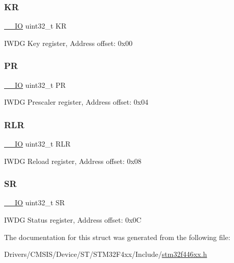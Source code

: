 \subsubsection{\texorpdfstring{KR}{KR}}
{\footnotesize\ttfamily \mbox{\hyperlink{core__sc300_8h_aec43007d9998a0a0e01faede4133d6be}{\+\_\+\+\_\+\+IO}} uint32\+\_\+t KR}

I\+W\+DG Key register, Address offset\+: 0x00 \mbox{\label{struct_i_w_d_g___type_def_af8d25514079514d38c104402f46470af}} 
\subsubsection{\texorpdfstring{PR}{PR}}
{\footnotesize\ttfamily \mbox{\hyperlink{core__sc300_8h_aec43007d9998a0a0e01faede4133d6be}{\+\_\+\+\_\+\+IO}} uint32\+\_\+t PR}

I\+W\+DG Prescaler register, Address offset\+: 0x04 \mbox{\label{struct_i_w_d_g___type_def_a7015e1046dbd3ea8783b33dc11a69e52}} 
\subsubsection{\texorpdfstring{R\+LR}{RLR}}
{\footnotesize\ttfamily \mbox{\hyperlink{core__sc300_8h_aec43007d9998a0a0e01faede4133d6be}{\+\_\+\+\_\+\+IO}} uint32\+\_\+t R\+LR}

I\+W\+DG Reload register, Address offset\+: 0x08 \mbox{\label{struct_i_w_d_g___type_def_af6aca2bbd40c0fb6df7c3aebe224a360}} 
\subsubsection{\texorpdfstring{SR}{SR}}
{\footnotesize\ttfamily \mbox{\hyperlink{core__sc300_8h_aec43007d9998a0a0e01faede4133d6be}{\+\_\+\+\_\+\+IO}} uint32\+\_\+t SR}

I\+W\+DG Status register, Address offset\+: 0x0C 

The documentation for this struct was generated from the following file\+:\begin{DoxyCompactItemize}
\item 
Drivers/\+C\+M\+S\+I\+S/\+Device/\+S\+T/\+S\+T\+M32\+F4xx/\+Include/\mbox{\hyperlink{stm32f446xx_8h}{stm32f446xx.\+h}}\end{DoxyCompactItemize}
